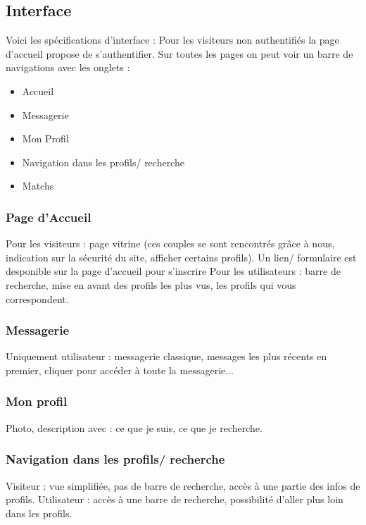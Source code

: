 \documentclass{scrartcl}
\begin{document}
    \subsection{Interface}

        Voici les spécifications d'interface : \newline
        Pour les visiteurs non authentifiés la page d'accueil propose de s'authentifier. \newline
        Sur toutes les pages on peut voir un barre de navigations avec les onglets :
            \begin{itemize}
                \item Accueil
                \item Messagerie
                \item Mon Profil
                \item Navigation dans les profils/ recherche
                \item Matchs
            \end{itemize}
        
        \subsubsection{Page d'Accueil}
            Pour les visiteurs : page vitrine (ces couples se sont rencontrés grâce à nous, indication sur la sécurité du site, afficher certains profils). Un lien/ formulaire est desponible sur la page d'accueil pour s'inscrire \newline
            Pour les utilisateurs : barre de recherche, mise en avant des profils les plus vus, les profils qui vous correspondent.
        \subsubsection{Messagerie}
            Uniquement utilisateur : messagerie classique, messages les plus récents en premier, cliquer pour accéder à toute la messagerie...

        \subsubsection{Mon profil}
            Photo, description avec : ce que je suis, ce que je recherche.
        \subsubsection{Navigation dans les profils/ recherche}
            Visiteur : vue simplifiée, pas de barre de recherche, accès à une partie des infos de profils. \newline
            Utilisateur : accès à une barre de recherche, possibilité d'aller plus loin dans les profils.
\end{document}
